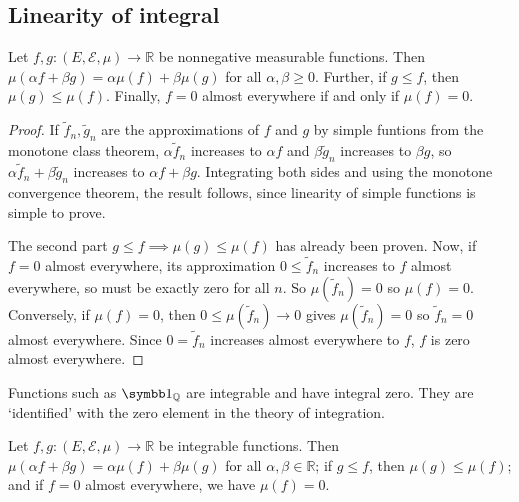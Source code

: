 \subsection{Linearity of integral}
\begin{theorem}
	Let \( f, g \colon (E, \mathcal E, \mu) \to \mathbb R \) be nonnegative measurable functions.
	Then \( \mu(\alpha f + \beta g) = \alpha \mu(f) + \beta \mu(g) \) for all \( \alpha, \beta \geq 0 \).
	Further, if \( g \leq f \), then \( \mu(g) \leq \mu(f) \).
	Finally, \( f = 0 \) almost everywhere if and only if \( \mu(f) = 0 \).
\end{theorem}
\begin{proof}
	If \( \widetilde f_n, \widetilde g_n \) are the approximations of \( f \) and \( g \) by simple funtions from the monotone class theorem, \( \alpha \widetilde f_n \) increases to \( \alpha f \) and \( \beta \widetilde g_n \) increases to \( \beta g \), so \( \alpha \widetilde f_n + \beta \widetilde g_n \) increases to \( \alpha f + \beta g \).
	Integrating both sides and using the monotone convergence theorem, the result follows, since linearity of simple functions is simple to prove.

	The second part \( g \leq f \implies \mu(g) \leq \mu(f) \) has already been proven.
	Now, if \( f = 0 \) almost everywhere, its approximation \( 0 \leq \widetilde f_n \) increases to \( f \) almost everywhere, so must be exactly zero for all \( n \).
	So \( \mu(\widetilde f_n) = 0 \) so \( \mu(f) = 0 \).
	Conversely, if \( \mu(f) = 0 \), then \( 0 \leq \mu(\widetilde f_n) \to 0 \) gives \( \mu(\widetilde f_n) = 0 \) so \( \widetilde f_n = 0 \) almost everywhere.
	Since \( 0 = \widetilde f_n \) increases almost everywhere to \( f \), \( f \) is zero almost everywhere.
\end{proof}
\begin{remark}
	Functions such as \( \symbb 1_{\mathbb Q} \) are integrable and have integral zero.
	They are `identified' with the zero element in the theory of integration.
\end{remark}
\begin{theorem}
	Let \( f, g \colon (E, \mathcal E, \mu) \to \mathbb R \) be integrable functions.
	Then \( \mu(\alpha f + \beta g) = \alpha \mu(f) + \beta \mu(g) \) for all \( \alpha, \beta \in \mathbb R \); if \( g \leq f \), then \( \mu(g) \leq \mu(f) \); and if \( f = 0 \) almost everywhere, we have \( \mu(f) = 0 \).
\end{theorem}

